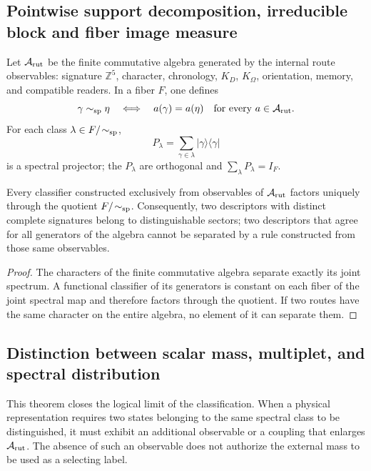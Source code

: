 \subsection{Pointwise support decomposition, irreducible block and fiber image measure}

Let \(\mathcal A_{\rm rut}\) be the finite commutative algebra generated by the
internal route observables: signature \(\mathbb Z^5\), character, chronology,
\(K_D\), \(K_\Omega\), orientation, memory, and compatible readers. In a
fiber \(F\), one defines
\[
 \gamma\sim_{\rm sp}\eta
 \quad\Longleftrightarrow\quad
 a(\gamma)=a(\eta)\quad\text{for every }a\in\mathcal A_{\rm rut}.
\]
For each class \(\lambda\in F/\!\sim_{\rm sp}\),
\[
 P_\lambda=\sum_{\gamma\in\lambda}
 |\gamma\rangle\langle\gamma|
\]
is a spectral projector; the \(P_\lambda\) are orthogonal and
\(\sum_\lambda P_\lambda=I_F\).

\begin{theorem}
Every classifier constructed exclusively from observables of \(\mathcal A_{\rm rut}\) factors uniquely through the quotient \(F/\!\sim_{\rm sp}\). Consequently, two descriptors with distinct complete signatures belong to distinguishable sectors; two descriptors that agree for all generators of the algebra cannot be separated by a rule constructed from those same observables.
\end{theorem}

\begin{proof}
The characters of the finite commutative algebra separate exactly its
joint spectrum. A functional classifier of its generators is constant
on each fiber of the joint spectral map and therefore factors through the
quotient. If two routes have the same character on the entire algebra, no
element of it can separate them.
\end{proof}

\subsection{Distinction between scalar mass, multiplet, and spectral distribution}

This theorem closes the logical limit of the classification. When a
physical representation requires two states belonging to the same
spectral class to be distinguished, it must exhibit an additional observable or a coupling that
enlarges \(\mathcal A_{\rm rut}\). The absence of such an observable does not authorize
the external mass to be used as a selecting label.

